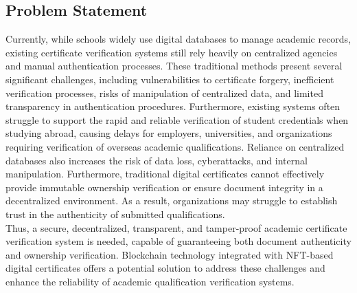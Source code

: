 \subsection{Problem Statement}

Currently, while schools widely use digital databases to manage academic records, existing certificate verification systems still rely heavily on centralized agencies and manual authentication processes. These traditional methods present several significant challenges, including vulnerabilities to certificate forgery, inefficient verification processes, risks of manipulation of centralized data, and limited transparency in authentication procedures. Furthermore, existing systems often struggle to support the rapid and reliable verification of student credentials when studying abroad, causing delays for employers, universities, and organizations requiring verification of overseas academic qualifications. Reliance on centralized databases also increases the risk of data loss, cyberattacks, and internal manipulation. Furthermore, traditional digital certificates cannot effectively provide immutable ownership verification or ensure document integrity in a decentralized environment. As a result, organizations may struggle to establish trust in the authenticity of submitted qualifications.\\

Thus, a secure, decentralized, transparent, and tamper-proof academic certificate verification system is needed, capable of guaranteeing both document authenticity and ownership verification. Blockchain technology integrated with NFT-based digital certificates offers a potential solution to address these challenges and enhance the reliability of academic qualification verification systems.\\